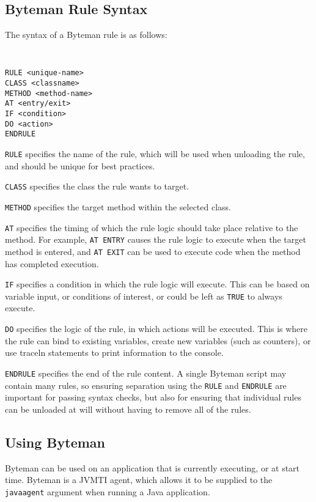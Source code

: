 \documentclass[letterpaper,twocolumn,10pt]{article}
\begin{document}
\subsection{Byteman Rule Syntax}

\noindent
The syntax of a Byteman rule is as follows:

{\tt \small
\begin{verbatim}
RULE <unique-name>
CLASS <classname>
METHOD <method-name>
AT <entry/exit>
IF <condition>
DO <action>
ENDRULE
\end{verbatim}
}

{\tt RULE} specifies the name of the rule, which will be used when unloading the rule, and should be unique for best practices.

{\tt CLASS} specifies the class the rule wants to target.

{\tt METHOD} specifies the target method within the selected class.

{\tt AT} specifies the timing of which the rule logic should take place relative to the method. For example, {\tt AT ENTRY} causes the rule logic to execute when the target method is entered, and {\tt AT EXIT} can be used to execute code when the method has completed execution.

{\tt IF} specifies a condition in which the rule logic will execute. This can be based on variable input, or conditions of interest, or could be left as {\tt TRUE} to always execute.

{\tt DO} specifies the logic of the rule, in which actions will be executed. This is where the rule can bind to existing variables, create new variables (such as counters), or use traceln statements to print information to the console.

{\tt ENDRULE} specifies the end of the rule content. A single Byteman script may contain many rules, so ensuring separation using the {\tt RULE} and {\tt ENDRULE} are important for passing syntax checks, but also for ensuring that individual rules can be unloaded at will without having to remove all of the rules. 

\subsection{Using Byteman}

Byteman can be used on an application that is currently executing, or at start time. Byteman is a JVMTI agent, which allows it to be supplied to the {\tt javaagent} argument when running a Java application. 
\end{document}
